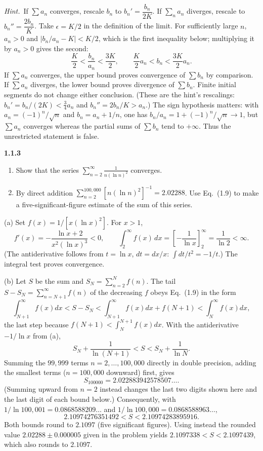 \emph{Hint.}~If $\sum a_{n}$ converges, rescale $b_{n}$ to
$b_{n}'=\dfrac{b_{n}}{2K}$. If $\sum_{n}a_{n}$ diverges, rescale to
$b_{n}''=\dfrac{2b_{n}}{K}$.
\solution
{}
Take $\epsilon=K/2$ in the definition of the limit. For sufficiently
large $n$, $a_n>0$ and $|b_n/a_n-K|<K/2$, which is the first inequality
below; multiplying it by $a_n>0$ gives the second:
\[
 \frac K2<\frac{b_n}{a_n}<\frac{3K}{2},\qquad
 \frac K2 a_n<b_n<\frac{3K}{2}a_n.
\]
If $\sum a_n$ converges, the upper bound proves convergence of $\sum b_n$
by comparison.
If $\sum a_n$ diverges, the lower bound proves divergence of $\sum b_n$.
Finite initial segments do not change either conclusion.
(These are the hint's rescalings: $b_n'=b_n/(2K)<\tfrac34a_n$ and
$b_n''=2b_n/K>a_n$.)
The sign hypothesis matters: with $a_n=(-1)^n/\sqrt n$ and
$b_n=a_n+1/n$, one has $b_n/a_n=1+(-1)^n/\sqrt n\to1$,
but $\sum a_n$ converges whereas the partial sums of $\sum b_n$
tend to $+\infty$. Thus the unrestricted statement is false.


\par\bigskip
\noindent\textbf{1.1.3}\quad
\begin{enumerate}
\item[(a)] Show that the series
  $\displaystyle\sum_{n=2}^{\infty}\frac{1}{n(\ln n)^{2}}$ converges.
\item[(b)] By direct addition
  $\sum_{n=2}^{100{,}000}[n(\ln n)^{2}]^{-1}=2.02288$. Use Eq.~(1.9) to make a
  five-significant-figure estimate of the sum of this series.
\end{enumerate}
\solution
(a) Set $f(x)=1/[x(\ln x)^2]$. For $x>1$,
\[
 f'(x)=-\frac{\ln x+2}{x^2(\ln x)^3}<0,\qquad
 \int_2^\infty f(x)\,dx=
 \left[-\frac1{\ln x}\right]_2^\infty=\frac1{\ln2}<\infty.
\]
(The antiderivative follows from $t=\ln x$, $dt=dx/x$:
$\int dt/t^2=-1/t$.) The integral test proves convergence.

(b) Let $S$ be the sum and $S_N=\sum_{n=2}^N f(n)$. The tail
$S-S_N=\sum_{n=N+1}^\infty f(n)$ of the decreasing $f$ obeys Eq.~(1.9)
in the form
\[
 \int_{N+1}^\infty f(x)dx< S-S_N<\int_{N+1}^\infty f(x)dx+f(N+1)
 <\int_N^\infty f(x)dx,
\]
the last step because $f(N+1)<\int_N^{N+1}f(x)dx$. With the
antiderivative $-1/\ln x$ from (a),
\[
 S_N+\frac1{\ln(N+1)}<S<S_N+\frac1{\ln N}.
\]
Summing the $99{,}999$ terms $n=2,\ldots,100{,}000$ directly in double
precision, adding the smallest terms ($n=100{,}000$ downward) first, gives
\[
 S_{100000}=2.022883942578507\ldots.
\]
(Summing upward from $n=2$ instead changes the last two digits shown
here and the last digit of each bound below.)
Consequently, with $1/\ln 100{,}001=0.0868588209\ldots$ and
$1/\ln 100{,}000=0.0868588963\ldots$,
\[
 2.10974276351492<S<2.10974283895916.
\]
Both bounds round to $\boxed{2.1097}$ (five significant figures).
Using instead the rounded value $2.02288\pm0.000005$ given in the
problem yields $2.1097338<S<2.1097439$, which also rounds to $2.1097$.


